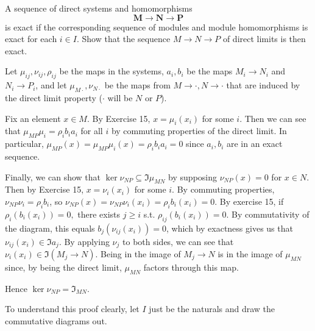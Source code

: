 \documentclass[a4paper]{exam}
\begin{document}
\begin{questions}
	\question A sequence of direct systems and homomorphisms
	\[
		\bm{M} \to \bm{N} \to \bm{P}
	\]
	is exact if the corresponding sequence of modules and module homomorphisms is exact for each $i\in I $. Show that the sequence $M\to N\to P $ of direct limits is then exact.
	\begin{solution}
		Let $\mu_{ij},\nu_{ij},\rho_{ij} $ be the maps in the systems, $a_i,b_i $ be the maps $M_i\to N_i $ and $N_i\to P_i $, and let $\mu_{M\cdot}, \nu_{N\cdot}$ be the maps from $M\to \cdot, N\to\cdot $ that are induced by the direct limit property ($\cdot $ will be $N $ or $P $).

		Fix an element $x \in M $.
		By Exercise 15, $x = \mu_i(x_i) $ for some $i $.
		Then we can see that $\mu_{MP} \mu_i = \rho _i b_ia_i $ for all $i $ by commuting properties of the direct limit.
		In particular, $\mu _{MP}(x) = \mu _{MP}\mu_i(x) = \rho_i b_ia_i = 0$ since $a_i,b_i $ are in an exact sequence.

		Finally, we can show that $\ker \nu_{NP} \subseteq \Im \mu_{MN} $ by supposing $\nu_{NP}(x) = 0 $ for $x\in N $.
		Then by Exercise 15, $x = \nu_i(x_i) $ for some $i $.
		By commuting properties, $\nu_{NP}\nu_i = \rho_ib_i $, so $\nu_{NP}(x) = \nu_{NP}\nu_i(x_i) = \rho_ib_i(x_i) = 0 $.
		By exercise 15, if $\rho_i(b_i(x_i)) = 0, $ there exists $j\ge i $ s.t. $\rho_{ij}(b_i(x_i)) = 0 $.
		By commutativity of the diagram, this equals $b_j(\nu_{ij}(x_i)) = 0 $, which by exactness gives us that $\nu_{ij}(x_i) \in \Im a_j $.
		By applying $\nu_j $ to both sides, we can see that $\nu_i(x_i) \in \Im(M_j\to N) $.
		Being in the image of $M_j\to N $ is in the image of $\mu_{MN} $ since, by being the direct limit, $\mu_{MN} $ factors through this map.

		Hence $\ker \nu_{NP} = \Im_{MN} $.

		To understand this proof clearly, let $I $ just be the naturals and draw the commutative diagrams out.
	\end{solution}


\end{questions}
\end{document}
